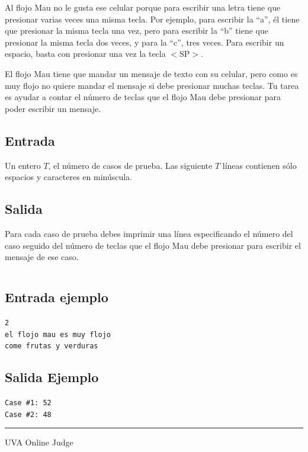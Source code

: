 \documentclass[letter,10pt]{article}
\newcommand{\lyxaddress}[1]{
\par {\raggedright #1
\vspace{1.4em}
\noindent\par}
}
\begin{document}
Al flojo Mau no le gusta ese celular porque para escribir una letra tiene que presionar varias veces una misma tecla. Por ejemplo, para escribir la ``a'', él tiene que presionar la misma tecla una vez, pero para escribir la ``b'' tiene que presionar la misma tecla dos veces, y para la ``c'', tres veces. Para escribir un espacio, basta con presionar una vez la tecla $<$SP$>$.

El flojo Mau tiene que mandar un mensaje de texto con su celular, pero como es muy flojo no quiere mandar el mensaje si debe presionar muchas teclas. Tu tarea es ayudar a contar el número de teclas que el flojo Mau debe presionar para poder escribir un mensaje.

\subsection*{Entrada}

Un entero $T$, el número de casos de prueba. Las siguiente $T$ líneas contienen sólo espacios y caracteres en minúscula.

\subsection*{Salida}

Para cada caso de prueba debes imprimir una línea especificando el número del caso seguido del número de teclas que el flojo Mau debe presionar para escribir el mensaje de ese caso.

$$$$
$$$$
$$$$
$$$$
$$$$

\subsection*{Entrada ejemplo}
\noindent \texttt{2}~\\
\texttt{el flojo mau es muy flojo}~\\
\texttt{come frutas y verduras}~\\
\noindent 

\subsection*{Salida Ejemplo}

\noindent \texttt{Case \#1: 52}~\\
\texttt{Case \#2: 48}~\\

\noindent \rule[0.5ex]{1\columnwidth}{1pt}


\lyxaddress{UVA Online Judge}
\end{document}
